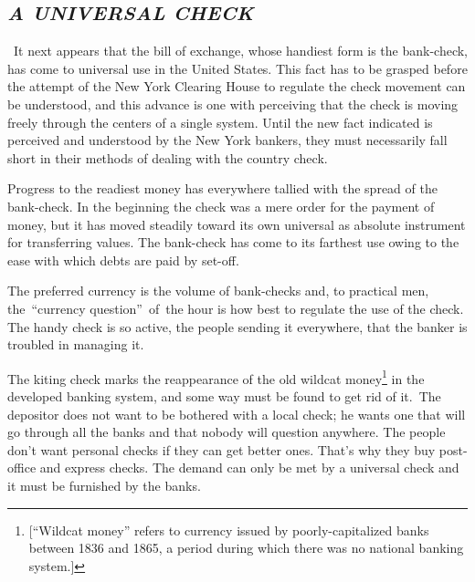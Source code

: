 \documentclass[openany,nobib]{tufte-book}
\begin{document}
\enlargethispage{\baselineskip}

\hypertarget{a-universal-check}{%
\subsection{\texorpdfstring{\emph{A UNIVERSAL
CHECK}}{A UNIVERSAL CHECK}}\label{a-universal-check}}

~It next appears that the bill of exchange, whose handiest form is the
bank-check, has come to universal use in the United States. This fact
has to be grasped before the attempt of the New York Clearing House to
regulate the check movement can be understood, and this advance is one
with perceiving that the check is moving freely through the centers of a
single system. Until the new fact indicated is perceived and understood
by the New York bankers, they must necessarily fall short in their
methods of dealing with the country check.~

Progress to the readiest money has everywhere tallied with the spread of
the bank-check. In the beginning the check was a mere order for the
payment of money, but it has moved steadily toward its own universal as
absolute instrument for transferring values. The bank-check has come to
its farthest use owing to the ease with which debts are paid by
set-off.~

The preferred currency is the volume of bank-checks and, to practical
men, the~``currency question''~of~the hour is how best to regulate the
use of the check. The handy check is so active, the people sending it
everywhere, that the banker is troubled in managing it.~

The kiting check marks the reappearance of the old wildcat
money\footnote{{[}``Wildcat money'' refers to currency issued by
  poorly-capitalized banks between 1836 and 1865, a period during which
  there was no national banking system.{]}} in the developed banking
system, and some way must be found to get rid of it.~The depositor does
not want to be bothered with a local check; he wants one that will go
through all the banks and that nobody will question anywhere. The people
don't want personal checks if they can get better ones. That's why they
buy post-office and express checks. The demand can only be met by a
universal check and it must be furnished by the banks. ~

\enlargethispage{\baselineskip}
\end{document}
